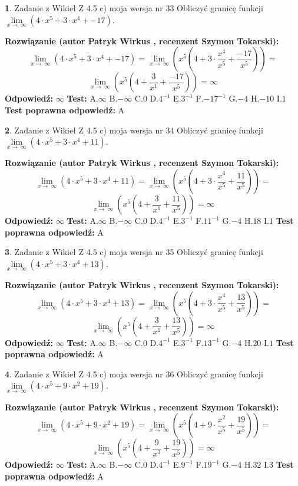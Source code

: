 \documentclass[12pt, a4paper]{article}
\theoremstyle{definition} %
\newtheorem{zad}{}
\newcommand{\zadStart}[1]{\begin{zad}#1\newline}
\newcommand{\zadStop}{\end{zad}}
\newcommand{\rozwStart}[2]{\noindent \textbf{Rozwiązanie (autor #1 , recenzent #2): }\newline}
\newcommand{\rozwStop}{\newline}
\newcommand{\odpStart}{\noindent \textbf{Odpowiedź:}\newline}
\newcommand{\odpStop}{\newline}
\newcommand{\testStart}{\noindent \textbf{Test:}\newline}
\newcommand{\testStop}{\newline}
\newcommand{\kluczStart}{\noindent \textbf{Test poprawna odpowiedź:}\newline}
\newcommand{\kluczStop}{\newline}
\begin{document}
\zadStart{Zadanie z Wikieł Z 4.5 c) moja wersja nr 33}
Obliczyć granicę funkcji  $\lim\limits_{x\to\ \infty}(4 \cdot x^{5}+3 \cdot x^{4}+-17)$.
\zadStop
\rozwStart{Patryk Wirkus}{Szymon Tokarski}
$$\lim\limits_{x\to\ \infty}(4 \cdot x^{5}+3 \cdot x^{4}+-17) = \lim\limits_{x\to\ \infty}(x^{5}(4 +3 \cdot \frac{x^{4}}{x^{5}}+\frac{-17}{x^{5}})) =$$ $$\lim\limits_{x\to\ \infty}(x^{5}(4 +\frac{3}{x^{1}}+\frac{-17}{x^{5}})) =\infty$$
\rozwStop
\odpStart
$\infty$
\odpStop
\testStart
A.$\infty$ B.$-\infty$ C.$0$ D.$4^{-1}$ E.$3^{-1}$
F.$-17^{-1}$ G.$-4$
H.$-10$
I.$1$
\testStop
\kluczStart
A
\kluczStop



\zadStart{Zadanie z Wikieł Z 4.5 c) moja wersja nr 34}
Obliczyć granicę funkcji  $\lim\limits_{x\to\ \infty}(4 \cdot x^{5}+3 \cdot x^{4}+11)$.
\zadStop
\rozwStart{Patryk Wirkus}{Szymon Tokarski}
$$\lim\limits_{x\to\ \infty}(4 \cdot x^{5}+3 \cdot x^{4}+11) = \lim\limits_{x\to\ \infty}(x^{5}(4 +3 \cdot \frac{x^{4}}{x^{5}}+\frac{11}{x^{5}})) =$$ $$\lim\limits_{x\to\ \infty}(x^{5}(4 +\frac{3}{x^{1}}+\frac{11}{x^{5}})) =\infty$$
\rozwStop
\odpStart
$\infty$
\odpStop
\testStart
A.$\infty$ B.$-\infty$ C.$0$ D.$4^{-1}$ E.$3^{-1}$
F.$11^{-1}$ G.$-4$
H.$18$
I.$1$
\testStop
\kluczStart
A
\kluczStop



\zadStart{Zadanie z Wikieł Z 4.5 c) moja wersja nr 35}
Obliczyć granicę funkcji  $\lim\limits_{x\to\ \infty}(4 \cdot x^{5}+3 \cdot x^{4}+13)$.
\zadStop
\rozwStart{Patryk Wirkus}{Szymon Tokarski}
$$\lim\limits_{x\to\ \infty}(4 \cdot x^{5}+3 \cdot x^{4}+13) = \lim\limits_{x\to\ \infty}(x^{5}(4 +3 \cdot \frac{x^{4}}{x^{5}}+\frac{13}{x^{5}})) =$$ $$\lim\limits_{x\to\ \infty}(x^{5}(4 +\frac{3}{x^{1}}+\frac{13}{x^{5}})) =\infty$$
\rozwStop
\odpStart
$\infty$
\odpStop
\testStart
A.$\infty$ B.$-\infty$ C.$0$ D.$4^{-1}$ E.$3^{-1}$
F.$13^{-1}$ G.$-4$
H.$20$
I.$1$
\testStop
\kluczStart
A
\kluczStop



\zadStart{Zadanie z Wikieł Z 4.5 c) moja wersja nr 36}
Obliczyć granicę funkcji  $\lim\limits_{x\to\ \infty}(4 \cdot x^{5}+9 \cdot x^{2}+19)$.
\zadStop
\rozwStart{Patryk Wirkus}{Szymon Tokarski}
$$\lim\limits_{x\to\ \infty}(4 \cdot x^{5}+9 \cdot x^{2}+19) = \lim\limits_{x\to\ \infty}(x^{5}(4 +9 \cdot \frac{x^{2}}{x^{5}}+\frac{19}{x^{5}})) =$$ $$\lim\limits_{x\to\ \infty}(x^{5}(4 +\frac{9}{x^{3}}+\frac{19}{x^{5}})) =\infty$$
\rozwStop
\odpStart
$\infty$
\odpStop
\testStart
A.$\infty$ B.$-\infty$ C.$0$ D.$4^{-1}$ E.$9^{-1}$
F.$19^{-1}$ G.$-4$
H.$32$
I.$3$
\testStop
\kluczStart
A
\kluczStop
\end{document}
